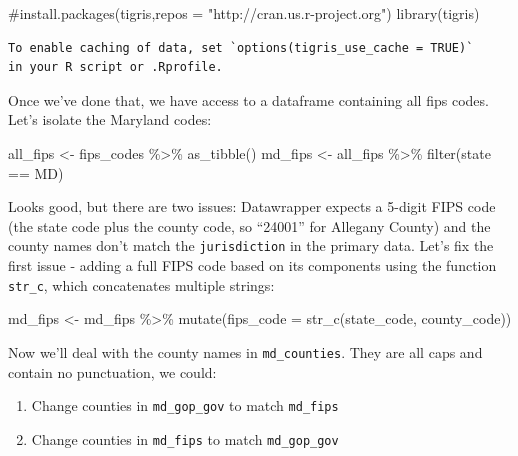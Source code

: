 \documentclass[
  letterpaper,
  DIV=11,
  numbers=noendperiod]{scrreprt}
\newenvironment{Shaded}{\begin{snugshade}}{\end{snugshade}}
\newcommand{\AttributeTok}[1]{\textcolor[rgb]{0.40,0.45,0.13}{#1}}
\newcommand{\CommentTok}[1]{\textcolor[rgb]{0.37,0.37,0.37}{#1}}
\newcommand{\FunctionTok}[1]{\textcolor[rgb]{0.28,0.35,0.67}{#1}}
\newcommand{\NormalTok}[1]{\textcolor[rgb]{0.00,0.23,0.31}{#1}}
\newcommand{\OtherTok}[1]{\textcolor[rgb]{0.00,0.23,0.31}{#1}}
\newcommand{\SpecialCharTok}[1]{\textcolor[rgb]{0.37,0.37,0.37}{#1}}
\newcommand{\StringTok}[1]{\textcolor[rgb]{0.13,0.47,0.30}{#1}}
\providecommand{\tightlist}{%
  \setlength{\itemsep}{0pt}\setlength{\parskip}{0pt}}\usepackage{longtable,booktabs,array}
\begin{document}
\begin{Shaded}
\begin{Highlighting}[]
\CommentTok{\#install.packages(\textquotesingle{}tigris\textquotesingle{},repos = "http://cran.us.r{-}project.org")}
\FunctionTok{library}\NormalTok{(tigris)}
\end{Highlighting}
\end{Shaded}

\begin{verbatim}
To enable caching of data, set `options(tigris_use_cache = TRUE)`
in your R script or .Rprofile.
\end{verbatim}

Once we've done that, we have access to a dataframe containing all fips
codes. Let's isolate the Maryland codes:

\begin{Shaded}
\begin{Highlighting}[]
\NormalTok{all\_fips }\OtherTok{\textless{}{-}}\NormalTok{ fips\_codes }\SpecialCharTok{\%\textgreater{}\%} \FunctionTok{as\_tibble}\NormalTok{()}
\NormalTok{md\_fips }\OtherTok{\textless{}{-}}\NormalTok{ all\_fips }\SpecialCharTok{\%\textgreater{}\%} \FunctionTok{filter}\NormalTok{(state }\SpecialCharTok{==} \StringTok{\textquotesingle{}MD\textquotesingle{}}\NormalTok{)}
\end{Highlighting}
\end{Shaded}

Looks good, but there are two issues: Datawrapper expects a 5-digit FIPS
code (the state code plus the county code, so ``24001'' for Allegany
County) and the county names don't match the \texttt{jurisdiction} in
the primary data. Let's fix the first issue - adding a full FIPS code
based on its components using the function \texttt{str\_c}, which
concatenates multiple strings:

\begin{Shaded}
\begin{Highlighting}[]
\NormalTok{md\_fips }\OtherTok{\textless{}{-}}\NormalTok{ md\_fips }\SpecialCharTok{\%\textgreater{}\%} \FunctionTok{mutate}\NormalTok{(}\AttributeTok{fips\_code =} \FunctionTok{str\_c}\NormalTok{(state\_code, county\_code))}
\end{Highlighting}
\end{Shaded}

Now we'll deal with the county names in \texttt{md\_counties}. They are
all caps and contain no punctuation, we could:

\begin{enumerate}
\def\labelenumi{\arabic{enumi}.}
\tightlist
\item
  Change counties in \texttt{md\_gop\_gov} to match \texttt{md\_fips}
\item
  Change counties in \texttt{md\_fips} to match \texttt{md\_gop\_gov}
\end{enumerate}
\end{document}

